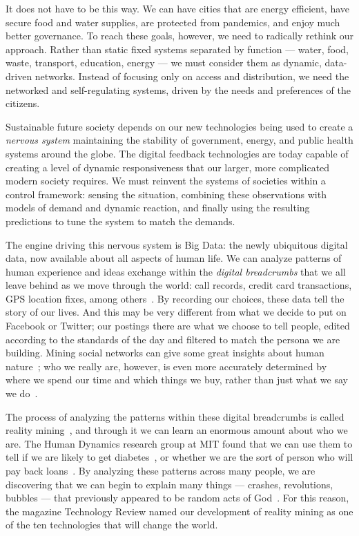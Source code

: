 It does not have to be this way.
We can have cities that are energy efficient, have secure food and water supplies, are protected from pandemics, and enjoy much better governance.
To reach these goals, however, we need to radically rethink our approach.
Rather than static fixed systems separated by function --- water, food, waste, transport, education, energy --- we must consider them as dynamic, data-driven networks.
Instead of focusing only on access and distribution, we need the networked and self-regulating systems, driven by the needs and preferences of the citizens.

Sustainable future society depends on our new technologies being used to create a \emph{nervous system} maintaining the stability of government, energy, and public health systems around the globe.
The digital feedback technologies are today capable of creating a level of dynamic responsiveness that our larger, more complicated modern society requires.
We must reinvent the systems of societies within a control framework: sensing the situation, combining these observations with models of demand and dynamic reaction, and finally using the resulting predictions to tune the system to match the demands.

The engine driving this nervous system is Big Data: the newly ubiquitous digital data, now available about all aspects of human life.
We can analyze patterns of human experience and ideas exchange within the \emph{digital breadcrumbs} that we all leave behind as we move through the world: call records, credit card transactions, GPS location fixes, among others~\cite{lazer2009life}.
By recording our choices, these data tell the story of our lives.
And this may be very different from what we decide to put on Facebook or Twitter; our postings there are what we choose to tell people, edited according to the standards of the day and filtered to match the persona we are building.
Mining social networks can give some great insights about human nature~\cite{aral2012identifying,mislove2010pulse, vitak2011s}; who we really are, however, is even more accurately determined by where we spend our time and which things we buy, rather than just what we say we do~\cite{madrigal2013dark}.

The process of analyzing the patterns within these digital breadcrumbs is called reality mining~\cite{eagle2006reality,pentland2009reality}, and through it we can learn an enormous amount about who we are.
The Human Dynamics research group at MIT found that we can use them to tell if we are likely to get diabetes~\cite{pentland2009using}, or whether we are the sort of person who will pay back loans~\cite{singh2013classifying}.
By analyzing these patterns across many people, we are discovering that we can begin to explain many things --- crashes, revolutions, bubbles --- that previously appeared to be random acts of God~\cite{pan2012decoding}.
For this reason, the magazine Technology Review named our development of reality mining as one of the ten technologies that will change the world\cite{greene2008reality}. 

